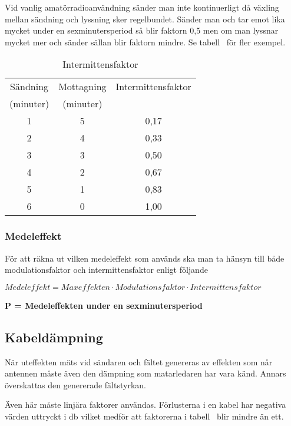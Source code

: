 Vid vanlig amatörradioanvändning sänder man inte kontinuerligt då växling
mellan sändning och lyssning sker regelbundet.
Sänder man och tar emot lika mycket under en sexminutersperiod så blir faktorn
0,5 men om man lyssnar mycket mer och sänder sällan blir faktorn mindre.
Se tabell~ för fler exempel.

\begin{table}[H]
  \begin{center}
    \begin{tabular}{|c|c|c|}
	\hline
	Sändning  & Mottagning & Intermittensfaktor \\
	(minuter) & (minuter)  & \\ \hline
	1 & 5 & 0,17 \\ \hline
	2 & 4 & 0,33 \\ \hline
	3 & 3 & 0,50 \\ \hline
	4 & 2 & 0,67 \\ \hline
	5 & 1 & 0,83 \\ \hline
	6 & 0 & 1,00 \\ \hline
    \end{tabular}
    \caption{Intermittensfaktor}
    \label{tab:intfakt}
  \end{center}
\end{table}

\subsubsection{Medeleffekt}

För att räkna ut vilken medeleffekt som används ska man ta hänsyn
till både modulationsfaktor och intermittensfaktor enligt följande

\(\textit{Medeleffekt} = \textit{Maxeffekten} \cdot \textit{Modulationsfaktor} \cdot \textit{Intermittensfaktor}\)

\noindent\textbf{P = Medeleffekten under en sexminutersperiod}

\subsection{Kabeldämpning}

När uteffekten mäts vid sändaren och fältet genereras av effekten som
når antennen måste även den dämpning som matarledaren har vara känd.
Annars överskattas den genererade fältstyrkan.

Även här måste linjära faktorer användas.
Förlusterna i en kabel har negativa värden uttryckt i \unit{\decibel} vilket
medför att faktorerna i tabell~ blir mindre än ett.

